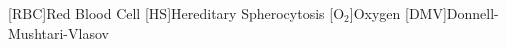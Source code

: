 
	
	[$\mathrm{RBC}$]{Red Blood Cell }
	[$\mathrm{HS}$]{Hereditary Spherocytosis }
	[$\mathrm{O_2}$]{Oxygen }
	[$\mathrm{DMV}$]{Donnell-Mushtari-Vlasov }





